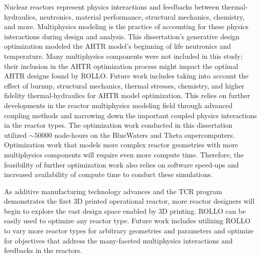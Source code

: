 Nuclear reactors represent physics interactions and feedbacks between thermal-hydraulics, 
neutronics, material performance, structural mechanics, chemistry, and more. 
Multiphysics modeling is the practice of accounting for these physics interactions 
during design and analysis. 
This dissertation's generative design optimization modeled the \gls{AHTR} model's 
beginning of life neutronics and temperature. 
Many multiphysics components were not included in this study; their inclusion in
the \gls{AHTR} optimization process might impact the optimal \gls{AHTR} designs 
found by \gls{ROLLO}. 
Future work includes taking into account the effect of burnup, structural mechanics, 
thermal stresses, chemistry, and higher fidelity thermal-hydraulics for \gls{AHTR} 
model optimization. 
This relies on further developments in the reactor multiphysics modeling 
field through advanced coupling methods and narrowing down the important coupled 
physics interactions in the reactor types. 
The optimization work conducted in this dissertation utilized $\sim 50000$ node-hours 
on the BlueWaters and Theta supercomputers. 
Optimization work that models more complex reactor geometries with more 
multiphysics components will require even more compute time. 
Therefore, the feasibility of further optimization work also relies on software 
speed-ups and increased availability of compute time to conduct these simulations. 

As additive manufacturing technology advances and the \gls{TCR} program 
demonstrates the first 3D printed operational reactor, more reactor designers 
will begin to explore the vast design space enabled by 3D printing. 
\gls{ROLLO} can be easily used to optimize any reactor type. 
Future work includes utilizing \gls{ROLLO} to vary more reactor types for arbitrary
geometries and parameters and optimize for objectives that address the many-faceted 
multiphysics interactions and feedbacks in the reactors.